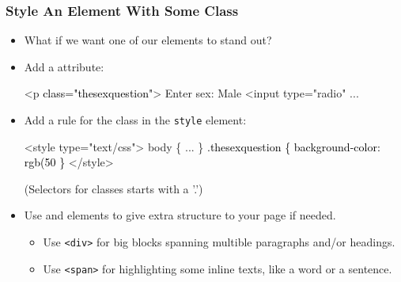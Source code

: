 \documentclass[dvipsnames,handout]{beamer}
\begin{document}
\begin{frame}[fragile]
  \frametitle{Style An Element With Some Class}

  \begin{itemize}
  \item What if we want one of our elements to stand out?
  \item<2-> Add a  attribute:
    \begin{small}\color{gray}
      \begin{semiverbatim}
<p \textcolor{black}{class="thesexquestion"}>
Enter sex: Male <input type="radio" ...
      \end{semiverbatim}
    \end{small}
  \item<3-> Add a rule for the class in the \texttt{style} element:
    \begin{small}\color{gray}
\begin{semiverbatim}
<style type="text/css">
  body \{ ... \}
  \textcolor{black}{.thesexquestion \{ 
     background-color: rgb(50%
  \}}
</style>
\end{semiverbatim}
    \end{small}
    (Selectors for classes starts with a '.')
  \item<4->  Use  and 
    elements to give extra structure to your page if needed.
    \begin{itemize}
    \item Use \texttt{<div>} for big blocks spanning multible
      paragraphs and/or headings.
    \item Use \texttt{<span>} for highlighting some inline texts, like
      a word or a sentence.
    \end{itemize}
  \end{itemize}



\end{frame}






\end{document}
